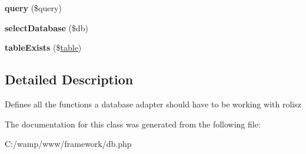 \begin{DoxyCompactItemize}
\item 
\hypertarget{interfacedatabase_adapter_ac9fddec3f6bd1db128887a1b211d90f0}{
{\bfseries query} (\$query)}
\label{interfacedatabase_adapter_ac9fddec3f6bd1db128887a1b211d90f0}

\item 
\hypertarget{interfacedatabase_adapter_ab624b0b234f9db9dbc6dc4180f566b1f}{
{\bfseries selectDatabase} (\$db)}
\label{interfacedatabase_adapter_ab624b0b234f9db9dbc6dc4180f566b1f}

\item 
\hypertarget{interfacedatabase_adapter_ae7cdaa744d52a1eb0103e377023ca528}{
{\bfseries tableExists} (\$\hyperlink{classtable}{table})}
\label{interfacedatabase_adapter_ae7cdaa744d52a1eb0103e377023ca528}

\end{DoxyCompactItemize}


\subsection{Detailed Description}
Defines all the functions a database adapter should have to be working with rolisz 

The documentation for this class was generated from the following file:\begin{DoxyCompactItemize}
\item 
C:/wamp/www/framework/db.php\end{DoxyCompactItemize}
